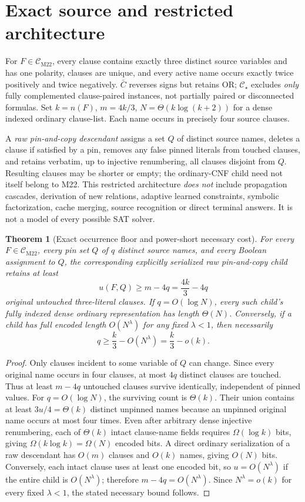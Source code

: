 \documentclass[11pt]{article}
\newtheorem{theorem}{Theorem}
\begin{document}
\section{Exact source and restricted architecture}
For $F\in\mathcal C_{\mathrm{M22}}$, every clause contains exactly three distinct source variables and has one polarity, clauses are unique, and every active name occurs exactly twice positively and twice negatively. $\bar C$ reverses signs but retains OR; $\mathcal C_\star$ excludes \emph{only} fully complemented clause-paired instances, not partially paired or disconnected formulas. Set $k=n(F)$, $m=4k/3$, $N=\Theta(k\log(k+2))$ for a dense indexed ordinary clause-list. Each name occurs in precisely four source clauses.

A \emph{raw pin-and-copy descendant} assigns a set $Q$ of distinct source names, deletes a clause if satisfied by a pin, removes any false pinned literals from touched clauses, and retains verbatim, up to injective renumbering, all clauses disjoint from $Q$. Resulting clauses may be shorter or empty; the ordinary-CNF child need not itself belong to M22. This restricted architecture \emph{does not} include propagation cascades, derivation of new relations, adaptive learned constraints, symbolic factorization, cache merging, source recognition or direct terminal answers. It is not a model of every possible SAT solver.

\begin{theorem}[Exact occurrence floor and power-short necessary cost]
For every $F\in\mathcal C_{\mathrm{M22}}$, every pin set $Q$ of $q$ distinct source names, and every Boolean assignment to $Q$, the corresponding explicitly serialized raw pin-and-copy child retains at least
\[
u(F,Q)\ge m-4q=\frac{4k}{3}-4q
\]
original untouched three-literal clauses. If $q=O(\log N)$, every such child's fully indexed dense ordinary representation has length $\Theta(N)$. Conversely, if a child has full encoded length $O(N^\lambda)$ for any fixed $\lambda<1$, then necessarily
\[
q\ge\frac{k}{3}-O(N^\lambda)=\frac{k}{3}-o(k).
\]
\end{theorem}
\begin{proof}
Only clauses incident to some variable of $Q$ can change. Since every original name occurs in four clauses, at most $4q$ distinct clauses are touched. Thus at least $m-4q$ untouched clauses survive identically, independent of pinned values. For $q=O(\log N)$, the surviving count is $\Theta(k)$. Their union contains at least $3u/4=\Theta(k)$ distinct unpinned names because an unpinned original name occurs at most four times. Even after arbitrary dense injective renumbering, each of $\Theta(k)$ intact clause-name fields requires $\Omega(\log k)$ bits, giving $\Omega(k\log k)=\Omega(N)$ encoded bits. A direct ordinary serialization of a raw descendant has $O(m)$ clauses and $O(k)$ names, giving $O(N)$ bits. Conversely, each intact clause uses at least one encoded bit, so $u=O(N^\lambda)$ if the entire child is $O(N^\lambda)$; therefore $m-4q=O(N^\lambda)$. Since $N^\lambda=o(k)$ for every fixed $\lambda<1$, the stated necessary bound follows.
\end{proof}
\end{document}
